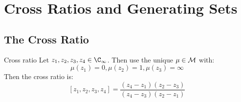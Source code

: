 \documentclass[../Main.tex]{subfiles}
\begin{document}
\section{Cross Ratios and Generating Sets}
\subsection{The Cross Ratio}
\begin{definition}{Cross ratio}
    Let $z_1, z_2, z_3, z_4 \in \CInf$. Then use the unique $\mu \in \mathcal{M}$ with:
    \begin{equation*}
        \mu(z_1) = 0, \mu(z_2) = 1, \mu(z_3) = \infty
    \end{equation*}
    Then the cross ratio is:
    \begin{equation*}
        \left[z_1, z_2, z_3, z_4\right] = \frac{(z_4 - z_1)(z_2 - z_3)}{(z_4 - z_3)(z_2 - z_1)}
    \end{equation*}
\end{definition}
\end{document}
